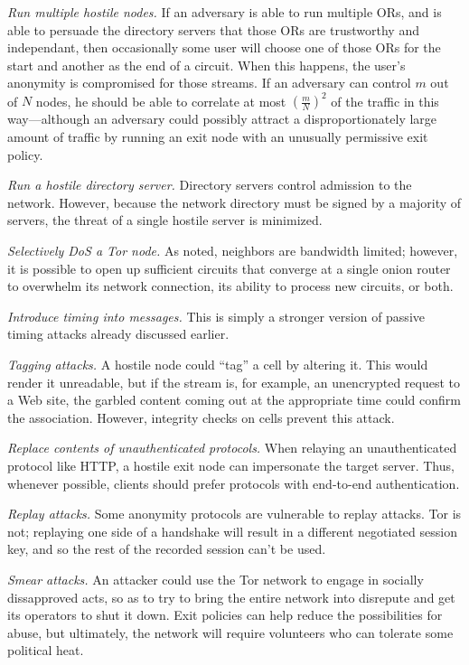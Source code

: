 \documentclass[times,10pt,twocolumn]{article}
\begin{document}
\emph{Run multiple hostile nodes.}  If an adversary is able to
run multiple ORs, and is able to persuade the directory servers
that those ORs are trustworthy and independant, then occasionally
some user will choose one of those ORs for the start and another
as the end of a circuit.  When this happens, the user's
anonymity is compromised for those streams.  If an adversary can
control $m$ out of $N$ nodes, he should be able to correlate at most 
$\left(\frac{m}{N}\right)^2$ of the traffic in this way---although an 
adversary
could possibly attract a disproportionately large amount of traffic
by running an exit node with an unusually permissive exit policy.

\emph{Run a hostile directory server.} Directory servers control
admission to the network. However, because the network directory
must be signed by a majority of servers, the threat of a single
hostile server is minimized.
  
\emph{Selectively DoS a Tor node.} As noted, neighbors are
bandwidth limited; however, it is possible to open up sufficient
circuits that converge at a single onion router to
overwhelm its network connection, its ability to process new
circuits, or both.

\emph{Introduce timing into messages.} This is simply a stronger
version of passive timing attacks already discussed earlier.
  
\emph{Tagging attacks.} A hostile node could ``tag'' a
cell by altering it. This would render it unreadable, but if the
stream is, for example, an unencrypted request to a Web site,
the garbled content coming out at the appropriate time could confirm
the association. However, integrity checks on cells prevent
this attack.

\emph{Replace contents of unauthenticated protocols.}  When
relaying an unauthenticated protocol like HTTP, a hostile exit node 
can impersonate the target server.  Thus, whenever possible, clients
should prefer protocols with end-to-end authentication.

\emph{Replay attacks.} Some anonymity protocols are vulnerable
to replay attacks.  Tor is not; replaying one side of a handshake
will result in a different negotiated session key, and so the rest
of the recorded session can't be used.  

\emph{Smear attacks.} An attacker could use the Tor network to
engage in socially dissapproved acts, so as to try to bring the
entire network into disrepute and get its operators to shut it down.
Exit policies can help reduce the possibilities for abuse, but
ultimately, the network will require volunteers who can tolerate
some political heat.
\end{document}
